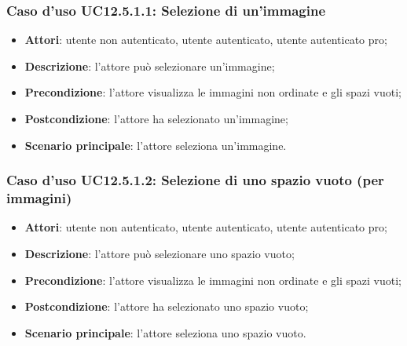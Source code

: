 \subsubsection{Caso d'uso UC12.5.1.1: Selezione di un'immagine}
\begin{itemize}
\item \textbf{Attori}: utente non autenticato, utente autenticato, utente autenticato pro;
\item \textbf{Descrizione}: l'attore può selezionare un'immagine;
\item \textbf{Precondizione}: l'attore visualizza le immagini non ordinate e gli spazi vuoti;
\item \textbf{Postcondizione}: l'attore ha selezionato un'immagine;
\item \textbf{Scenario principale}: l'attore seleziona un'immagine.
\end{itemize}

\subsubsection{Caso d'uso UC12.5.1.2: Selezione di uno spazio vuoto (per immagini)}
\begin{itemize}
\item \textbf{Attori}: utente non autenticato, utente autenticato, utente autenticato pro;
\item \textbf{Descrizione}: l'attore può selezionare uno spazio vuoto;
\item \textbf{Precondizione}: l'attore visualizza le immagini non ordinate e gli spazi vuoti;
\item \textbf{Postcondizione}: l'attore ha selezionato uno spazio vuoto;
\item \textbf{Scenario principale}: l'attore seleziona uno spazio vuoto.
\end{itemize}

